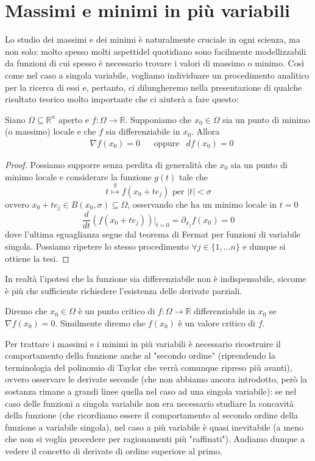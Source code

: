 \documentclass[openany]{book}
\begin{document}
\section{Massimi e minimi in più variabili}
Lo studio dei massimi e dei minimi è naturalmente cruciale in ogni scienza, ma non solo: molto spesso molti aspettidel quotidiano sono facilmente modellizzabili da funzioni di cui spesso è necessario trovare i valori di massimo o minimo. Così come nel caso a singola variabile, vogliamo individuare un procedimento analitico per la ricerca di essi e, pertanto, ci dilungheremo nella presentazione di qualche risultato teorico molto importante che ci aiuterà a fare questo:
\begin{theorem}
Siano $\Omega \subseteq \mathbb{R}^n$ aperto e $f: \Omega \to \mathbb{R}$. Supponiamo che $x_0 \in \Omega$ sia un punto di minimo (o massimo) locale e che $f$ sia differenziabile in $x_0$. Allora
\begin{align*}
&\nabla{f(x_0)} = 0 & &\text{oppure} &df(x_0) = 0 
\end{align*}
\end{theorem}
\begin{proof}
Possiamo supporre senza perdita di generalità che $x_0$ sia un punto di minimo locale e considerare la funzione $g(t)$ tale che
$$
t \stackrel{g}{\mapsto} f(x_0 + te_j) \text{ per } |t| < \sigma
$$
ovvero $x_0 + te_j \in B(x_0, \sigma) \subseteq \Omega$, osservando che ha un minimo locale in $t=0$
$$
\frac{d}{dt} \left( f(x_0 + te_j) \right){\big|_{t=0}} = \partial_{x_j} f(x_0) = 0
$$
dove l'ultima eguaglianza segue dal teorema di Fermat per funzioni di variabile singola. Possiamo ripetere lo stesso procedimento $\forall j \in \{1, \ldots n \}$ e dunque si ottiene la tesi.
\end{proof}
\begin{remark}
In realtà l'ipotesi che la funzione sia differenziabile non è indispensabile, siccome è più che sufficiente richiedere l'esistenza delle derivate parziali.
\end{remark}
\begin{definition}
Diremo che $x_0 \in \Omega$ è un punto critico di $f: \Omega \to \mathbb{R}$ differenziabile in $x_0$ se $\nabla{f(x_0)} = 0$. Similmente diremo che $f(x_0)$ è un valore critico di $f$.
\end{definition}
Per trattare i massimi e i minimi in più variabili è necessario ricostruire il comportamento della funzione anche al "secondo ordine" (riprendendo la terminologia del polinomio di Taylor che verrà comunque ripreso più avanti), ovvero osservare le derivate seconde (che non abbiamo ancora introdotto, però la sostanza rimane a grandi linee quella nel caso ad una singola variabile): se nel caso delle funzioni a singola variabile non era necessario studiare la concavità della funzione (che ricordiamo essere il comportamento al secondo ordine della funzione a variabile singola), nel caso a più variabile è quasi inevitabile (a meno che non si voglia procedere per ragionamenti più "raffinati"). Andiamo dunque a vedere il concetto di derivate di ordine superiore al primo. \\
\end{document}
